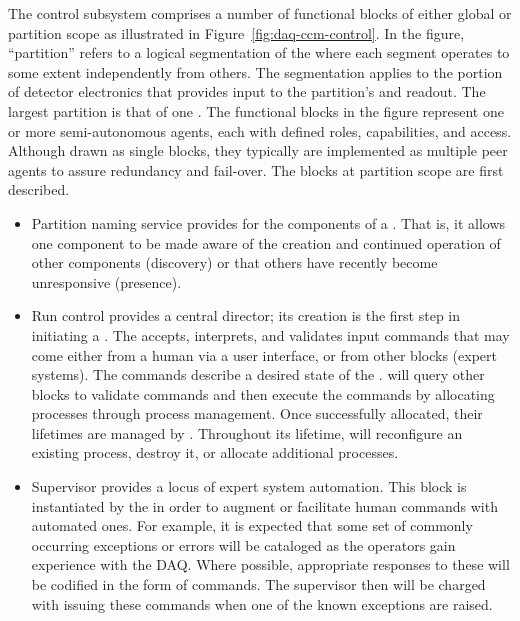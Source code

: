 The control subsystem comprises a number of functional blocks of either global
or partition scope as illustrated in Figure~\ref{fig:daq-ccm-control}. 
In the figure, ``partition'' refers to a logical segmentation of the 
where each segment operates to some extent independently from others. 
The segmentation applies to the portion of detector electronics that provides
input to the partition's  and readout. 
The largest partition %
is that of one . 
The functional blocks in the figure represent one or more semi-autonomous
agents, each with defined roles, capabilities, and access. 
Although drawn as single blocks, they typically are implemented as multiple peer
agents to assure redundancy and fail-over. 
The blocks at partition scope are first described.

\begin{itemize}
\item Partition naming service provides  for the components of
  a . 
  That is, it allows one component to be made aware of the creation and
  continued operation of other components (discovery) or that others have
  recently become unresponsive (presence). 

\item Run control provides a central director; its creation is the first step in
  initiating a . 
  The  accepts, interprets, and validates input commands that may come
  either from a human via a user interface, or from other blocks (expert
  systems). 
  The commands describe a desired state of the . 
   will query other blocks to validate commands and then execute the
  commands by allocating processes through process management. 
  Once successfully allocated, their lifetimes are managed by . 
  Throughout its lifetime,  will reconfigure an existing process,
  destroy it, or allocate additional processes. 

\item Supervisor provides a locus of expert system automation. 
  This block is instantiated by the  in order to augment or facilitate
  human commands with automated ones. 
  For example, it is expected that some set of commonly occurring exceptions or
  errors will be cataloged as the operators gain experience with the DAQ. 
  Where possible, appropriate responses to these will be codified in the form of
   commands. 
  The supervisor then will be charged with issuing these commands when one of
  the known exceptions are raised.

\end{itemize}


